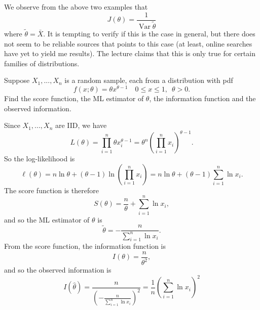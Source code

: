 \documentclass[notoc,notitlepage]{tufte-book}
\DeclareMathOperator{\Var}{Var }
\begin{document}
\begin{note}
  We observe from the above two examples that
  \begin{equation*}
    J(\theta) = \frac{1}{\Var{\tilde{\theta}}}
  \end{equation*}
  where $\tilde{\theta} = \bar{X}$. It is tempting to verify if this is the case in general, but there does not seem to be reliable sources that points to this case (at least, online searches have yet to yield me results). The lecture claims that this is only true for certain families of distributions.
\end{note}

\begin{eg}\label{eg:6_6}
  Suppose $X_1, ..., X_n$ is a random sample, each from a distribution with pdf
  \begin{equation*}
    f(x; \theta) = \theta x^{\theta - 1} \quad 0 \leq x \leq 1, \enspace \theta > 0.
  \end{equation*}
  Find the score function, the ML estimator of $\theta$, the information function and the observed information.
\end{eg}

\begin{solution}
  Since $X_1, ..., X_n$ are IID, we have
  \begin{equation*}
    L(\theta) = \prod_{i=1}^{n} \theta x_i^{\theta - 1} = \theta^n \left( \prod_{i=1}^{n} x_i \right)^{\theta - 1}.
  \end{equation*}
  So the log-likelihood is
  \begin{equation*}
    \ell(\theta) = n \ln \theta + ( \theta - 1 ) \ln \left( \prod_{i=1}^{n} x_i \right) = n \ln \theta + ( \theta - 1 ) \sum_{i=1}^{n} \ln x_i.
  \end{equation*}
  The score function is therefore
  \begin{equation*}
    S(\theta) = \frac{n}{\theta} + \sum_{i=1}^{n} \ln x_i,
  \end{equation*}
  and so the ML estimator of $\theta$ is
  \begin{equation*}
    \tilde{\theta} = - \frac{n}{\sum\limits_{i=1}^{n} \ln x_i}.
  \end{equation*}
  From the score function, the information function is
  \begin{equation*}
    I(\theta) = \frac{n}{\theta^2},
  \end{equation*}
  and so the observed information is
  \begin{equation*}
    I(\hat{\theta}) = \frac{n}{\left( - \frac{n}{\sum_{i=1}^{n} \ln x_i} \right)^2} = \frac{1}{n} \left( \sum_{i=1}^{n} \ln x_i \right)^2
  \end{equation*}
\end{solution}
\end{document}
